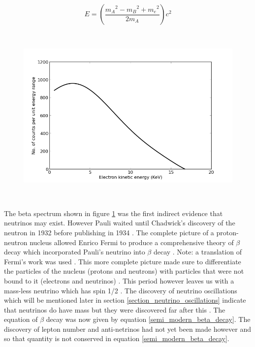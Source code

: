 \documentclass[12pt,a4paper]{article}
\begin{document}
\begin{equation}
    E = \left( \frac{{m_A}^2 - {m_B}^2 + {m_e}^2}{2m_A}\right) c^2
    \label{constant_ke_e_equation}
\end{equation}

\begin{figure}[H]
 \centering
 \includegraphics[height=90mm]{beta_spectrum.png}
 \label{beta_spectrum}
\end{figure}

The beta spectrum shown in figure \ref{beta_spectrum} was the first indirect evidence that neutrinos may exist. However Pauli waited until Chadwick's discovery of the neutron in 1932 \cite{chadwick1932possible} before publishing in 1934 \cite{lederman1970resource}. The complete picture of a proton-neutron nucleus allowed Enrico Fermi to produce a comprehensive theory of $\beta$ decay which incorporated Pauli's neutrino into $\beta$ decay \cite{lederman1970resource} \cite{Fermi:1934hr}. Note: a translation of Fermi's work was used \cite{wilson1968fermi}. This more complete picture made sure to differentiate the particles of the nucleus (protons and neutrons) with particles that were not bound to it (electrons and neutrinos) \cite{Fermi:1934hr} \cite{wilson1968fermi}. This period however leaves us with a mass-less neutrino which has spin 1/2 \cite{lederman1970resource}. The discovery of neutrino oscillations which will be mentioned later in section \ref{section_neutrino_oscillations} indicate that neutrinos do have mass but they were discovered far after this \cite{griffiths2008book} \cite{griffiths2008neutrino1.5}. The equation of $\beta$ decay was now given by equation \ref{semi_modern_beta_decay}. The discovery of lepton number and anti-netrinos had not yet been made however and so that quantity is not conserved in equation \ref{semi_modern_beta_decay}. 
\end{document}
